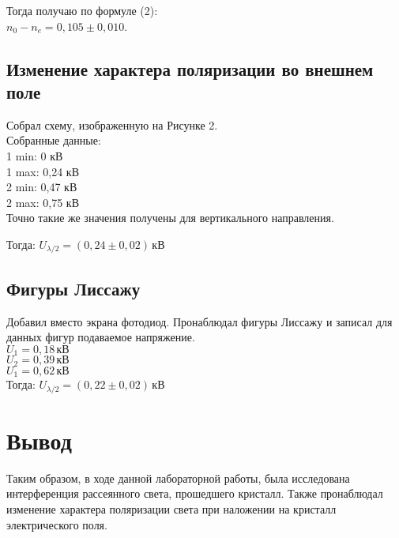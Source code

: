 Тогда получаю по формуле (2): \\
$ n_0 - n_e = 0,105 \pm 0,010 $.

\subsection{Изменение характера поляризации во внешнем поле}

Собрал схему, изображенную на Рисунке 2. \\

Собранные данные: \\

1 min: 0 кВ \\
1 max: 0,24 кВ \\
2 min: 0,47 кВ \\
2 max: 0,75 кВ \\

Точно такие же значения получены для вертикального направления.

Тогда: $ U_{\lambda/2} = \left( 0,24 \pm 0,02 \right) \, \texttt{кВ}$

\subsection{Фигуры Лиссажу}

Добавил вместо экрана фотодиод. Пронаблюдал фигуры Лиссажу и записал для данных фигур
подаваемое напряжение. \\

$ U_1 = 0,18 \, \texttt{кВ} $ \\
$ U_2 = 0,39 \, \texttt{кВ} $ \\
$ U_1 = 0,62 \, \texttt{кВ} $ \\

Тогда: $ U_{\lambda/2} = \left( 0,22 \pm 0,02 \right) \, \texttt{кВ}$


\section{Вывод}

Таким образом, в ходе данной лабораторной работы, была исследована интерференция рассеянного
света, прошедшего кристалл. Также пронаблюдал изменение характера поляризации света при
наложении на кристалл электрического поля.
